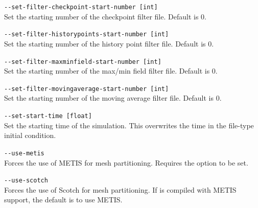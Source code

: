 \lstinline[style=BashInputStyle]{--set-filter-checkpoint-start-number [int]}\\
\hangindent=1.5cm
Set the starting number of the checkpoint filter file. Default is 0.

\lstinline[style=BashInputStyle]{--set-filter-historypoints-start-number [int]}\\
\hangindent=1.5cm
Set the starting number of the history point filter file. Default is 0.

\lstinline[style=BashInputStyle]{--set-filter-maxminfield-start-number [int]}\\
\hangindent=1.5cm
Set the starting number of the max/min field filter file. Default is 0.

\lstinline[style=BashInputStyle]{--set-filter-movingaverage-start-number [int]}\\
\hangindent=1.5cm
Set the starting number of the moving average filter file. Default is 0.

\lstinline[style=BashInputStyle]{--set-start-time [float]}\\
\hangindent=1.5cm
Set the starting time of the simulation. This overwrites the time in the file-type initial condition.

\lstinline[style=BashInputStyle]{--use-metis}\\
\hangindent=1.5cm
Forces the use of METIS for mesh partitioning. Requires the
 option to be set.

\lstinline[style=BashInputStyle]{--use-scotch}\\
\hangindent=1.5cm
Forces the use of Scotch for mesh partitioning. If \nekpp{} is compiled with
METIS support, the default is to use METIS.
